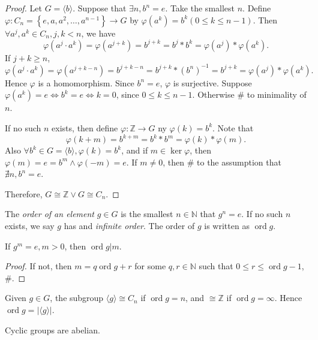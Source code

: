 \documentclass[10pt]{article}
\def\le{\leqslant}
\def\ge{\geqslant}
\DeclareMathOperator{\ord}{ord}
\begin{document}
    \begin{proof}
        Let $ G= \langle b \rangle  $. Suppose that $ \exists n, b^n=e $. Take the smallest $n$. Define $ \varphi: C_n = \left\{ e,a,a^2,\dots,a^{n-1}\right\}\to G $ by $ \varphi(a^k)=b^k(0\le k\le n-1) $. Then $ \forall a^j,a^k\in C_n, j,k<n $, we have 
        \[
            \varphi(a^j\cdot a^k)=\varphi(a^{j+k})=b^{j+k}= b^j*b^k=\varphi(a^j)*\varphi(a^k)
        .\]
        If $ j+k \ge n $, 
        \[
            \varphi(a^j\cdot a^k)=\varphi(a^{j+k-n})=b^{j+k-n}=b^{j+k}*(b^{n})^{-1}=b^{j+k}=\varphi(a^j)*\varphi(a^k)
        .\]
        Hence $ \varphi $ is a homomorphism. Since $ b^n=e $, $ \varphi $ is surjective. Suppose $ \varphi(a^k)=e \Leftrightarrow b^k=e \Leftrightarrow k=0 $, since $ 0\le k\le n-1 $. Otherwise \# to minimality of $n$.

        If no such $ n $ exists, then define $ \varphi: \mathbb{Z} \to G $ ny $ \varphi(k)=b^k $. Note that
        \[
            \varphi(k+m)=b^{k+m}=b^k*b^m=\varphi(k)*\varphi(m)
        .\]
        Also $ \forall b^k\in G=\langle b \rangle, \varphi(k)=b^k $, and if $ m\in \ker \varphi $, then $ \varphi(m)=e=b^m \land \varphi(-m)=e $. If $ m\neq 0 $, then \# to the assumption that $ \nexists n, b^n=e $.

        Therefore, $ G \cong \mathbb{Z} \lor G \cong C_n $.
    \end{proof}
    \begin{definition}
        The \textit{order of an element} $ g\in G $ is the smallest $ n\in \mathbb{N}  $ that $ g^n=e $. If no such $n$ exists, we say $g$ has and \textit{infinite order}. The order of $g$ is written as $ \ord g. $
    \end{definition}
    \begin{proposition}\label{prop:div_order}
        If $ g^m=e ,m>0$, then $ \ord g|m $.
    \end{proposition}
    \begin{proof}
        If not, then $ m=q\ord g +r$ for some $ q,r\in \mathbb{N}  $ such that $ 0\le r\le \ord g-1 $, \#.
    \end{proof}
    \begin{remark}
        Given $ g\in G $, the subgroup $ \langle g \rangle \cong C_n $ if $ \ord g=n $, and $ \cong \mathbb{Z}  $ if $ \ord g=\infty $. Hence $ \ord g=|\langle g \rangle | $. 
    \end{remark}
    \begin{proposition}\label{prop:cyclic_abelian}
        Cyclic groups are abelian.
    \end{proposition}
\end{document}
